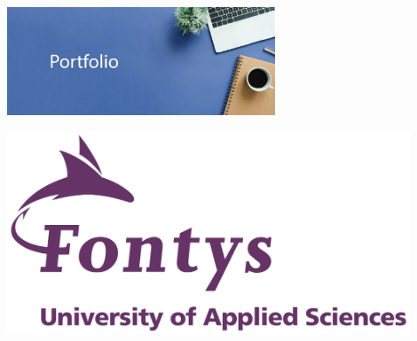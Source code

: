 \begin{titlepage}
    \begin{center}
        \vspace*{0.1cm}

        \Huge
        \textbf{\documentTitle}

        \vspace{0.3cm}
        \LARGE
        \documentSubtitle\\

        \vspace*{1.5cm}
        \includegraphics[width=0.6\textwidth]{images/PDR.jpeg}

        \vspace*{3.5cm}
        \begin{minipage}{0.5\textwidth}
            \centering
        \end{minipage}%
        \begin{minipage}{0.5\textwidth}
            \centering
            \includegraphics[width=0.9\textwidth]{images/fontys_logo.png}
        \end{minipage}%
    \end{center}
    \vfill


\end{titlepage}
